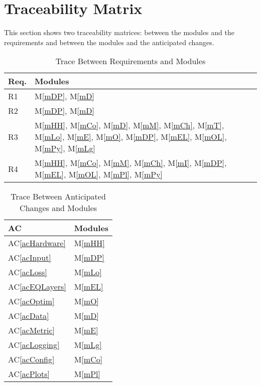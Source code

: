 \documentclass[12pt, titlepage]{article}
\newcommand{\acref}[1]{AC\ref{#1}}
\newcommand{\mref}[1]{M\ref{#1}}
\begin{document}
\section{Traceability Matrix} \label{SecTM}

This section shows two traceability matrices: between the modules and the
requirements and between the modules and the anticipated changes.

\begin{table}[H]
\centering
\begin{tabular}{p{} p{}}
\toprule
\textbf{Req.} & \textbf{Modules}\\
\midrule
R1 & \mref{mDP}, \mref{mD}\\
R2 & \mref{mDP}, \mref{mD}\\
R3 & \mref{mHH}, \mref{mCo}, \mref{mD}, \mref{mM}, \mref{mCh}, \mref{mT}, \mref{mLo}, \mref{mE}, \mref{mO}, \mref{mDP}, \mref{mEL}, \mref{mOL}, \mref{mPy}, \mref{mLg}\\
R4 & \mref{mHH}, \mref{mCo}, \mref{mM}, \mref{mCh}, \mref{mI}, \mref{mDP}, \mref{mEL}, \mref{mOL}, \mref{mPl}, \mref{mPy}\\
\bottomrule
\end{tabular}
\caption{Trace Between Requirements and Modules}
\label{TblRT}
\end{table}

\begin{table}[H]
\centering
\begin{tabular}{p{} p{}}
\toprule
\textbf{AC} & \textbf{Modules}\\
\midrule
\acref{acHardware} & \mref{mHH}\\
\acref{acInput} & \mref{mDP}\\
\acref{acLoss} & \mref{mLo}\\
\acref{acEQLayers} & \mref{mEL}\\
\acref{acOptim} & \mref{mO}\\
\acref{acData} & \mref{mD}\\
\acref{acMetric} & \mref{mE}\\
\acref{acLogging} & \mref{mLg}\\
\acref{acConfig} & \mref{mCo}\\
\acref{acPlots} & \mref{mPl}\\
\bottomrule
\end{tabular}
\caption{Trace Between Anticipated Changes and Modules}
\label{TblACT}
\end{table}
\end{document}
